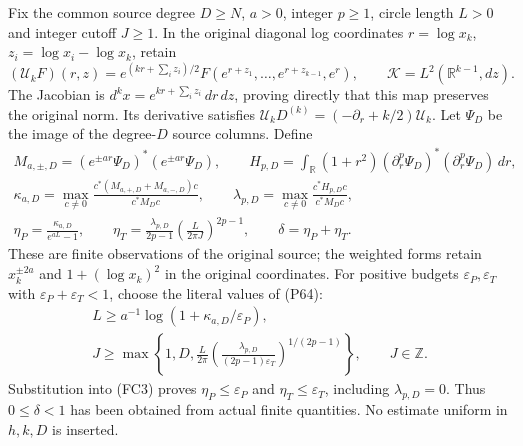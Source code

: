 Fix the common source degree $D\ge N$, $a>0$, integer $p\ge1$, circle
length $L>0$ and integer cutoff $J\ge1$. In the original diagonal log
coordinates $r=\log x_k$, $z_i=\log x_i-\log x_k$, retain
\[
 (\mathcal U_kF)(r,z)=e^{(kr+\sum_i z_i)/2}
 F(e^{r+z_1},\ldots,e^{r+z_{k-1}},e^r),\qquad
 \mathcal K=L^2(\mathbb R^{k-1},dz).
 \tag{FC2}
\]
The Jacobian is $d^kx=e^{kr+\sum_i z_i}\,dr\,dz$, proving directly that
this map preserves the original norm. Its derivative satisfies
$\mathcal U_kD^{(k)}=(-\partial_r+k/2)\mathcal U_k$.
Let $\Psi_D$ be the image of the degree-$D$ source columns. Define
\[
\begin{gathered}
 M_{a,\pm,D}=(e^{\pm ar}\Psi_D)^*(e^{\pm ar}\Psi_D),\qquad
 H_{p,D}=\int_{\mathbb R}(1+r^2)(\partial_r^p\Psi_D)^*
                  (\partial_r^p\Psi_D)\,dr,\\
 \kappa_{a,D}=\max_{c\ne0}
 \frac{c^*(M_{a,+,D}+M_{a,-,D})c}{c^*M_Dc},\qquad
 \lambda_{p,D}=\max_{c\ne0}\frac{c^*H_{p,D}c}{c^*M_Dc},\\
 \eta_P=\frac{\kappa_{a,D}}{e^{aL}-1},\qquad
 \eta_T=\frac{\lambda_{p,D}}{2p-1}
                   \left(\frac{L}{2\pi J}\right)^{2p-1},\qquad
 \delta=\eta_P+\eta_T .
\end{gathered}\tag{FC3}
\]
These are finite observations of the original source; the weighted forms
retain $x_k^{\pm2a}$ and $1+(\log x_k)^2$ in the original coordinates.
For positive budgets $\varepsilon_P,\varepsilon_T$ with
$\varepsilon_P+\varepsilon_T<1$, choose the literal values of (P64):
\[
\begin{gathered}
 L\ge a^{-1}\log(1+\kappa_{a,D}/\varepsilon_P),\\
 J\ge\max\left\{1,D,\frac{L}{2\pi}
       \left(\frac{\lambda_{p,D}}{(2p-1)\varepsilon_T}
       \right)^{1/(2p-1)}\right\},\qquad J\in\mathbb Z.
\end{gathered}\tag{FC3a}
\]
Substitution into (FC3) proves $\eta_P\le\varepsilon_P$ and
$\eta_T\le\varepsilon_T$, including $\lambda_{p,D}=0$.
Thus $0\le\delta<1$ has been obtained from actual finite quantities.
No estimate uniform in $h,k,D$ is inserted.

